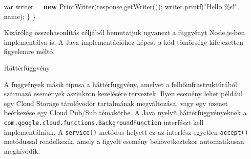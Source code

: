 \documentclass[
]{article}
\newenvironment{Shaded}{}{}
\newcommand{\AnnotationTok}[1]{\textcolor[rgb]{0.38,0.63,0.69}{\textbf{\textit{#1}}}}
\newcommand{\AttributeTok}[1]{\textcolor[rgb]{0.49,0.56,0.16}{#1}}
\newcommand{\BuiltInTok}[1]{\textcolor[rgb]{0.00,0.50,0.00}{#1}}
\newcommand{\CommentTok}[1]{\textcolor[rgb]{0.38,0.63,0.69}{\textit{#1}}}
\newcommand{\CommentVarTok}[1]{\textcolor[rgb]{0.38,0.63,0.69}{\textbf{\textit{#1}}}}
\newcommand{\DataTypeTok}[1]{\textcolor[rgb]{0.56,0.13,0.00}{#1}}
\newcommand{\FunctionTok}[1]{\textcolor[rgb]{0.02,0.16,0.49}{#1}}
\newcommand{\KeywordTok}[1]{\textcolor[rgb]{0.00,0.44,0.13}{\textbf{#1}}}
\newcommand{\NormalTok}[1]{#1}
\newcommand{\OperatorTok}[1]{\textcolor[rgb]{0.40,0.40,0.40}{#1}}
\newcommand{\PreprocessorTok}[1]{\textcolor[rgb]{0.74,0.48,0.00}{#1}}
\newcommand{\SpecialCharTok}[1]{\textcolor[rgb]{0.25,0.44,0.63}{#1}}
\newcommand{\StringTok}[1]{\textcolor[rgb]{0.25,0.44,0.63}{#1}}
\newcommand{\VerbatimStringTok}[1]{\textcolor[rgb]{0.25,0.44,0.63}{#1}}
\begin{document}
\begin{Shaded}
\begin{Highlighting}[]
    \DataTypeTok{var}\NormalTok{ writer }\OperatorTok{=} \KeywordTok{new} \BuiltInTok{PrintWriter}\OperatorTok{(}\NormalTok{response}\OperatorTok{.}\FunctionTok{getWriter}\OperatorTok{());}
\NormalTok{    writer}\OperatorTok{.}\FunctionTok{printf}\OperatorTok{(}\StringTok{"Hello }\SpecialCharTok{\%s}\StringTok{!"}\OperatorTok{,}\NormalTok{ name}\OperatorTok{);}
  \OperatorTok{\}}
\OperatorTok{\}}
\end{Highlighting}
\end{Shaded}

Kizárólag összehasonlítás céljából bemutatjuk ugyanezt a függvényt
Node.js-ben implementálva is. A Java implementációhoz képest a kód
tömörsége kifejezetten figyelemre méltó.

\begin{Shaded}
\end{Shaded}

Háttérfüggvény

A függvények másik típusa a háttérfüggvény, amelyet a
felhőinfrastruktúrából származó események aszinkron kezelésére
terveztek. Ilyen esemény lehet például egy Cloud Storage tárolóvödör
tartalmának megváltozása, vagy egy üzenet beérkezése egy Cloud Pub/Sub
témakörbe. A Java nyelvű háttérfüggvényeknek a
\texttt{com.google.cloud.functions.BackgroundFunction} interfészt kell
implementálniuk. A \texttt{service()} metódus helyett ez az interfész
egyetlen \texttt{accept()} metódussal rendelkezik, amely a figyelt
esemény bekövetkeztekor automatikusan meghívódik.
\end{document}
